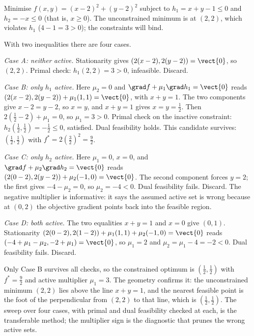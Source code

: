 Minimise $f(x, y) = (x - 2)^{2} + (y - 2)^{2}$ subject to $h_{1} =
x + y - 1 \leq 0$ and $h_{2} = -x \leq 0$ (that is, $x \geq 0$). The
unconstrained minimum is at $(2, 2)$, which violates $h_{1}$
($4 - 1 = 3 > 0$); the constraints will bind.

With two inequalities there are four cases.

\textit{Case A: neither active.} Stationarity gives $(2(x - 2),
2(y - 2)) = \vect{0}$, so $(2, 2)$. Primal check: $h_{1}(2, 2) =
3 > 0$, infeasible. Discard.

\textit{Case B: only $h_{1}$ active.} Here $\mu_{2} = 0$ and
$\grad f + \mu_{1}\grad h_{1} = \vect{0}$ reads $(2(x - 2), 2(y -
2)) + \mu_{1}(1, 1) = \vect{0}$, with $x + y = 1$. The two
components give $x - 2 = y - 2$, so $x = y$, and $x + y = 1$ gives
$x = y = \tfrac{1}{2}$. Then $2(\tfrac{1}{2} - 2) + \mu_{1} = 0$, so
$\mu_{1} = 3 > 0$. Primal check on the inactive constraint:
$h_{2}(\tfrac{1}{2}, \tfrac{1}{2}) = -\tfrac{1}{2} \leq 0$,
satisfied. Dual feasibility holds. This candidate survives:
$(\tfrac{1}{2}, \tfrac{1}{2})$ with $f^{*} = 2(\tfrac{3}{2})^{2} =
\tfrac{9}{2}$.

\textit{Case C: only $h_{2}$ active.} Here $\mu_{1} = 0$, $x = 0$,
and $\grad f + \mu_{2}\grad h_{2} = \vect{0}$ reads $(2(0 - 2),
2(y - 2)) + \mu_{2}(-1, 0) = \vect{0}$. The second component forces
$y = 2$; the first gives $-4 - \mu_{2} = 0$, so $\mu_{2} = -4 < 0$.
Dual feasibility fails. Discard. The negative multiplier is
informative: it says the assumed active set is wrong because at
$(0, 2)$ the objective gradient points back into the feasible region.

\textit{Case D: both active.} The two equalities $x + y = 1$ and
$x = 0$ give $(0, 1)$. Stationarity $(2(0 - 2), 2(1 - 2)) +
\mu_{1}(1, 1) + \mu_{2}(-1, 0) = \vect{0}$ reads $(-4 + \mu_{1} -
\mu_{2}, -2 + \mu_{1}) = \vect{0}$, so $\mu_{1} = 2$ and $\mu_{2} =
\mu_{1} - 4 = -2 < 0$. Dual feasibility fails. Discard.

Only Case B survives all checks, so the constrained optimum is
$(\tfrac{1}{2}, \tfrac{1}{2})$ with $f^{*} = \tfrac{9}{2}$ and active
multiplier $\mu_{1} = 3$. The geometry confirms it: the
unconstrained minimum $(2, 2)$ lies above the line $x + y = 1$, and
the nearest feasible point is the foot of the perpendicular from
$(2, 2)$ to that line, which is $(\tfrac{1}{2}, \tfrac{1}{2})$. The
sweep over four cases, with primal and dual feasibility checked at
each, is the transferable method; the multiplier sign is the
diagnostic that prunes the wrong active sets.

